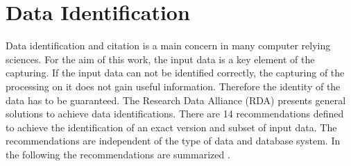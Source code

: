 \documentclass[draft,final]{vutinfth} %
\begin{document}
\section{Data Identification}\label{Data Identification}

Data identification and citation is a main concern in many computer relying sciences. For the aim of this work, the input data is a key element of the capturing. If the input data can not be identified correctly, the capturing of the processing on it does not gain useful information. Therefore the identity of the data has to be guaranteed. The Research Data Alliance (RDA) presents general solutions to achieve data identifications. There are 14 recommendations defined to achieve the identification of an exact version and subset of input data. The recommendations are independent of the type of data and database system. In the following the recommendations are summarized \cite{rauber2016identification}.
\end{document}
